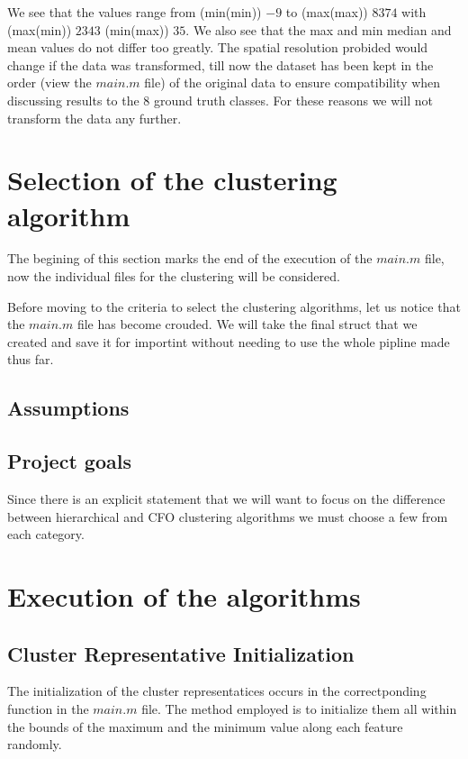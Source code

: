 \documentclass[12pt, a4paper]{article}
\begin{document}
We see that the values range from (min(min)) $-9$ to (max(max)) $8374$ with (max(min)) $2343$ (min(max)) $35$. We also see that the max and min median and mean values do not differ too greatly. The spatial resolution probided would change if the data was transformed, till now the dataset has been kept in the order (view the $main.m$ file) of the original data to ensure compatibility when discussing results to the 8 ground truth classes. For these reasons we will not transform the data any further.

\section{Selection of the clustering algorithm}

The begining of this section marks the end of the execution of the $main.m$ file, now the individual files for the clustering will be considered.
\newline

Before moving to the criteria to select the clustering algorithms, let us notice that the $main.m$ file has become crouded. We will take the final struct that we created and save it for importint without needing to use the whole pipline made thus far.

\subsection{Assumptions}

\subsection{Project goals}

Since there is an explicit statement that we will want to focus on the difference between hierarchical and CFO clustering algorithms we must choose a few from each category.
\newline

\section{Execution of the algorithms}

\subsection{Cluster Representative Initialization}

The initialization of the cluster representatices occurs in the correctponding function in the $main.m$ file. The method employed is to initialize them all within the bounds of the maximum and the minimum value along each feature randomly.
\end{document}
